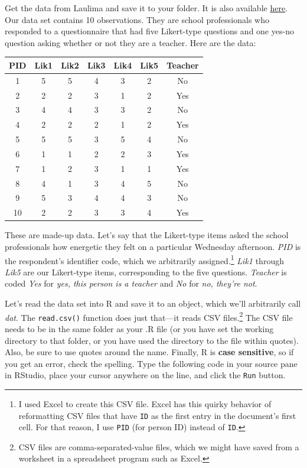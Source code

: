 \documentclass[
]{book}
\begin{document}
Get the data from Laulima and save it to your folder. It is also available \href{http://www2.hawaii.edu/~georgeha/Handouts/SchoolSurvey.csv}{here}.
Our data set contains 10 observations. They are school professionals who responded to a questionnaire that had five Likert-type questions and one yes-no question asking whether or not they are a teacher.
Here are the data:

\begin{tabular}{c|c|c|c|c|c|c}
\hline
PID & Lik1 & Lik2 & Lik3 & Lik4 & Lik5 & Teacher\\
\hline
1 & 5 & 5 & 4 & 3 & 2 & No\\
\hline
2 & 2 & 2 & 3 & 1 & 2 & Yes\\
\hline
3 & 4 & 4 & 3 & 3 & 2 & No\\
\hline
4 & 2 & 2 & 2 & 1 & 2 & Yes\\
\hline
5 & 5 & 5 & 3 & 5 & 4 & No\\
\hline
6 & 1 & 1 & 2 & 2 & 3 & Yes\\
\hline
7 & 1 & 2 & 3 & 1 & 1 & Yes\\
\hline
8 & 4 & 1 & 3 & 4 & 5 & No\\
\hline
9 & 5 & 3 & 4 & 4 & 3 & No\\
\hline
10 & 2 & 2 & 3 & 3 & 4 & Yes\\
\hline
\end{tabular}

These are made-up data. Let's say that the Likert-type items asked the school professionals how energetic they felt on a particular Wednesday afternoon. \emph{PID} is the respondent's identifier code, which we arbitrarily assigned.\footnote{I used Excel to create this CSV file. Excel has this quirky behavior of reformatting CSV files that have \texttt{ID} as the first entry in the document's first cell. For that reason, I use \texttt{PID} (for person ID) instead of \texttt{ID}.} \emph{Lik1} through \emph{Lik5} are our Likert-type items, corresponding to the five questions. \emph{Teacher} is coded \emph{Yes} for \emph{yes, this person is a teacher} and \emph{No} for \emph{no, they're not}.

Let's read the data set into R and save it to an object, which we'll arbitrarily call \emph{dat}. The \texttt{read.csv()} function does just that---it reads CSV files.\footnote{CSV files are comma-separated-value files, which we might have saved from a worksheet in a spreadsheet program such as Excel.} The CSV file needs to be in the same folder as your .R file (or you have set the working directory to that folder, or you have used the directory to the file within quotes). Also, be sure to use quotes around the name. Finally, R is \textbf{case sensitive}, so if you get an error, check the spelling. Type the following code in your source pane in RStudio, place your cursor anywhere on the line, and click the \texttt{Run} button.
\end{document}
